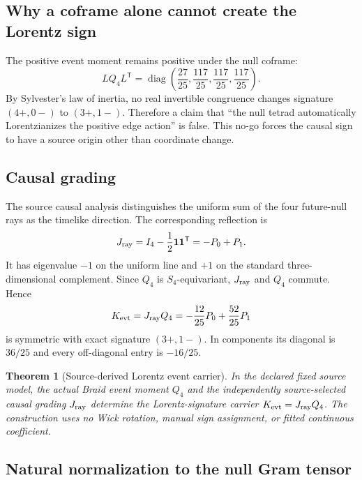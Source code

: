 \documentclass[11pt]{article}
\newtheorem{theorem}{Theorem}[section]
\theoremstyle{definition}
\theoremstyle{remark}
\begin{document}
\subsection{Why a coframe alone cannot create the Lorentz sign}

The positive event moment remains positive under the null coframe:
\begin{equation}
 LQ_4L^{\mathsf T}
 =\operatorname{diag}\!\left(
 \frac{27}{25},\frac{117}{25},\frac{117}{25},\frac{117}{25}
 \right).
\end{equation}
By Sylvester's law of inertia, no real invertible congruence changes signature $(4+,0-)$ to $(3+,1-)$. Therefore a claim that ``the null tetrad automatically Lorentzianizes the positive edge action'' is false. This no-go forces the causal sign to have a source origin other than coordinate change.

\subsection{Causal grading}

The source causal analysis distinguishes the uniform sum of the four future-null rays as the timelike direction. The corresponding reflection is
\begin{equation}\label{eq:jray}
 J_{\rm ray}=I_4-\frac12\mathbf1\mathbf1^{\mathsf T}
 =-P_0+P_1.
\end{equation}
It has eigenvalue $-1$ on the uniform line and $+1$ on the standard three-dimensional complement. Since $Q_4$ is $S_4$-equivariant, $J_{\rm ray}$ and $Q_4$ commute. Hence
\begin{equation}\label{eq:kevt}
 K_{\rm evt}=J_{\rm ray}Q_4
 =-\frac{12}{25}P_0+\frac{52}{25}P_1
\end{equation}
is symmetric with exact signature $(3+,1-)$. In components its diagonal is $36/25$ and every off-diagonal entry is $-16/25$.

\begin{theorem}[Source-derived Lorentz event carrier]\label{thm:carrier}
In the declared fixed source model, the actual Braid event moment $Q_4$ and the independently source-selected causal grading $J_{\rm ray}$ determine the Lorentz-signature carrier $K_{\rm evt}=J_{\rm ray}Q_4$. The construction uses no Wick rotation, manual sign assignment, or fitted continuous coefficient.
\end{theorem}

\subsection{Natural normalization to the null Gram tensor}
\end{document}
